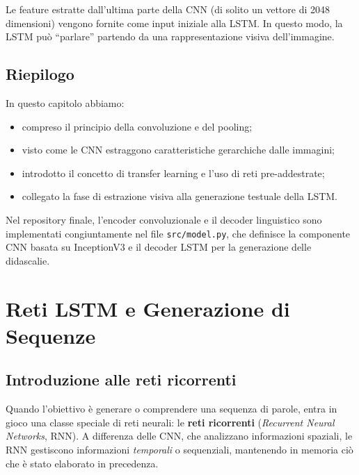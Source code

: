 \documentclass[11pt,a4paper]{report}
\begin{document}
\begin{tcolorbox}[title=Applicazione nel progetto]
Le feature estratte dall’ultima parte della CNN (di solito un vettore di 2048 dimensioni) vengono fornite come input iniziale alla LSTM.  
In questo modo, la LSTM può “parlare” partendo da una rappresentazione visiva dell’immagine.
\end{tcolorbox}

\section{Riepilogo}

In questo capitolo abbiamo:
\begin{itemize}
  \item compreso il principio della convoluzione e del pooling;
  \item visto come le CNN estraggono caratteristiche gerarchiche dalle immagini;
  \item introdotto il concetto di transfer learning e l’uso di reti pre-addestrate;
  \item collegato la fase di estrazione visiva alla generazione testuale della LSTM.
\end{itemize}

\begin{tcolorbox}[title=Riferimento al codice]
Nel repository finale, l'encoder convoluzionale e il decoder linguistico sono implementati congiuntamente nel file \texttt{src/model.py}, che definisce la componente CNN basata su InceptionV3 e il decoder LSTM per la generazione delle didascalie.
\end{tcolorbox}


\chapter{Reti LSTM e Generazione di Sequenze}

\section{Introduzione alle reti ricorrenti}

Quando l’obiettivo è generare o comprendere una sequenza di parole, entra in gioco una classe speciale di reti neurali: le \textbf{reti ricorrenti} (\emph{Recurrent Neural Networks}, RNN).  
A differenza delle CNN, che analizzano informazioni spaziali, le RNN gestiscono informazioni \emph{temporali} o sequenziali, mantenendo in memoria ciò che è stato elaborato in precedenza.
\end{document}
